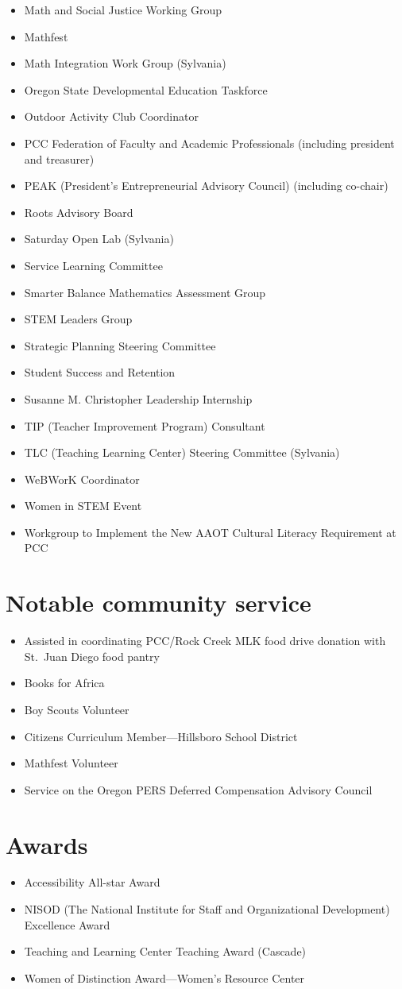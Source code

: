 \begin{itemize}[label={}]
\item Math and Social Justice Working Group
\item Mathfest
\item Math Integration Work Group (Sylvania)
\item Oregon State Developmental Education Taskforce
\item Outdoor Activity Club Coordinator
\item PCC Federation of Faculty and Academic Professionals (including president and treasurer)
\item PEAK (President's Entrepreneurial Advisory Council) (including co-chair)
\item Roots Advisory Board
\item Saturday Open Lab (Sylvania)
\item Service Learning Committee
\item Smarter Balance Mathematics Assessment Group
\item STEM Leaders Group
\item Strategic Planning Steering Committee
\item Student Success and Retention
\item Susanne M. Christopher Leadership Internship
\item TIP (Teacher Improvement Program) Consultant
\item TLC (Teaching Learning Center) Steering Committee (Sylvania)
\item WeBWorK Coordinator
\item Women in STEM Event
\item Workgroup to Implement the New AAOT Cultural Literacy Requirement at PCC
\end{itemize}

\section*{Notable community service}

\begin{itemize}
\item Assisted in coordinating PCC/Rock Creek MLK food drive donation with St.\ Juan Diego food pantry
\item Books for Africa
\item Boy Scouts Volunteer
\item Citizens Curriculum Member---Hillsboro School District
\item Mathfest Volunteer
\item Service on the Oregon PERS Deferred Compensation Advisory Council
\end{itemize}

\section*{Awards}

\begin{itemize}
\item Accessibility All-star Award
\item NISOD (The National Institute for Staff and Organizational Development) Excellence Award
\item Teaching and Learning Center Teaching Award (Cascade)
\item Women of Distinction Award---Women's Resource Center
\end{itemize}